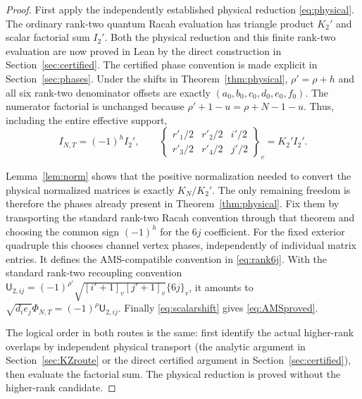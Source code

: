 \documentclass[10pt,a4paper]{article}
\newenvironment{revision}{\begingroup}{\endgroup}
\newcommand{\brac}[2]{\begin{Bmatrix}#1\\#2\end{Bmatrix}}
\begin{document}
\begin{proof}
First apply the independently established physical reduction
\eqref{eq:physical}. The ordinary rank-two quantum Racah evaluation
\cite{KR} has triangle product $K_2'$ and scalar factorial sum $I_2'$.
\begin{revision}
Both the physical reduction and this finite rank-two evaluation are now
proved in Lean by the direct construction in Section~\ref{sec:certified}.
The certified phase convention is made explicit in Section~\ref{sec:phases}.
\end{revision}
Under the shifts in Theorem~\ref{thm:physical},
$\rho'=\rho+h$ and all six rank-two denominator offsets are exactly
$(a_0,b_0,c_0,d_0,e_0,f_0)$. The numerator factorial is unchanged because
$\rho'+1-u=\rho+N-1-u$. Thus, including the entire effective support,
\begin{equation}\label{eq:scalarshift}
 I_{N,T}=(-1)^h I_2',\qquad
 \brac{r'_1/2&r'_2/2&i'/2}{r'_3/2&r'_4/2&j'/2}_{v}=K_2'I_2'.
\end{equation}

Lemma~\ref{lem:norm} shows that the positive normalization needed to
convert the physical normalized matrices is exactly $K_N/K_2'$.
The only remaining freedom is therefore the phases already present in
Theorem~\ref{thm:physical}. Fix them by transporting the standard rank-two
Racah convention through that theorem and choosing the common sign
$(-1)^h$ for the $6j$ coefficient. For the fixed exterior quadruple this chooses channel
vertex phases, independently of individual matrix entries. It defines the
AMS-compatible convention in \eqref{eq:rank6j}. With the standard rank-two
recoupling convention
$\mathsf U_{2,ij}=(-1)^{\rho'}\sqrt{[i'+1]_v[j'+1]_v}\{6j\}_{v}$,
it amounts to $\sqrt{d_i e_j}\Phi_{N,T}=(-1)^\rho\mathsf U_{2,ij}$.
Finally \eqref{eq:scalarshift} gives \eqref{eq:AMSproved}.

\begin{revision}
The logical order in both routes is the same: first identify the actual
higher-rank overlaps by independent physical transport (the analytic
argument in Section~\ref{sec:KZroute} or the direct certified argument in
Section~\ref{sec:certified}), then evaluate the factorial sum.
The physical reduction is proved without the higher-rank candidate.
\end{revision}
\end{proof}
\end{document}
